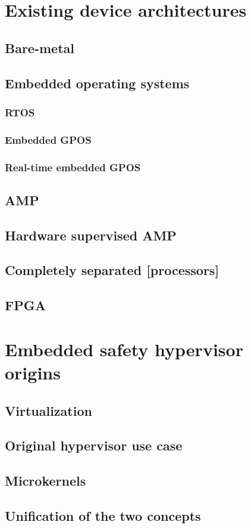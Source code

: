 \section{Existing device architectures}
\subsection{Bare-metal}
\subsection{Embedded operating systems}
\subsubsection{RTOS}
\subsubsection{Embedded GPOS}
\subsubsection{Real-time embedded GPOS}
\subsection{AMP}
\subsection{Hardware supervised AMP}
\subsection{Completely separated [processors]}
\subsection{FPGA}


\section{Embedded safety hypervisor origins}
\subsection{Virtualization}
\subsection{Original hypervisor use case}
\subsection{Microkernels}
\subsection{Unification of the two concepts}




